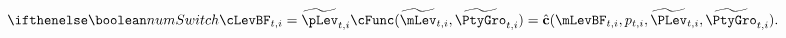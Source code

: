 \begin{equation}
 \ifnumSw \cLevBF_{t,i} = \perc{\pLev}_{t,i} \cFunc(\perc{\mLev}_{t,i},\perc{\PtyGro}_{t,i}) = \hat{\textbf{c}}(\mLevBF_{t,i}, p_{t,i}, \perc{\PLev}_{t,i}, \perc{\PtyGro}_{t,i}). \label{eq:cPerc}
\end{equation}
